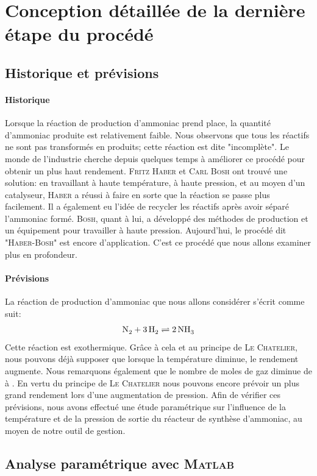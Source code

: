 \section{Conception détaillée de la dernière étape du procédé}
\subsection{Historique et prévisions}

\paragraph{Historique}
Lorsque la réaction de production d'ammoniac prend place, la quantité d'ammoniac produite est relativement faible.
Nous observons que tous les réactifs ne sont pas transformés en produits; cette réaction est dite "incomplète".
Le monde de l'industrie cherche depuis quelques temps à améliorer ce procédé pour obtenir un plus haut rendement.
\textsc{Fritz Haber} et \textsc{Carl Bosh} ont trouvé une solution: en travaillant à haute température, à haute pression, et au moyen
d'un catalyseur, \textsc{Haber} a réussi à faire en sorte que la réaction se passe plus facilement. Il a également eu l'idée
de recycler les réactifs après avoir séparé l'ammoniac formé. \textsc{Bosh}, quant à lui, a développé des méthodes de
production et un équipement pour travailler à haute pression. Aujourd'hui, le procédé dit "\textsc{Haber-Bosh}" est encore
d'application. C'est ce procédé que nous allons examiner plus en profondeur.

\paragraph{Prévisions}
La réaction de production d'ammoniac que nous allons considérer s'écrit comme suit:
$$\ce{N2} + \ce{3H2} \rightleftharpoons \ce{2NH3}$$
Cette réaction est exothermique. Grâce à cela et au principe de \textsc{Le Chatelier}, nous pouvons déjà supposer que lorsque
la température diminue, le rendement augmente. Nous remarquons également que le nombre de moles de gaz diminue de  à
. En vertu du principe de \textsc{Le Chatelier} nous pouvons encore prévoir un plus grand rendement lors d'une augmentation de
pression. Afin de vérifier ces prévisions, nous avons effectué une étude paramétrique sur l'influence de la température et de la
pression de sortie du réacteur de synthèse d'ammoniac, au moyen de notre outil de gestion.

\subsection{Analyse paramétrique avec \textsc{Matlab}}

